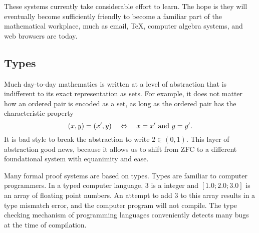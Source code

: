 \documentclass{llncs}
\begin{document}
These systems currently take considerable effort to learn.  The hope
is they will eventually become sufficiently friendly
to become a familiar part of the 
mathematical workplace, much as email, \TeX\relax, computer algebra systems, and
web browsers are today.

\subsection{Types}

Much day-to-day mathematics is written at a level of abstraction that is
indifferent to its exact representation  as sets.  For example, 
it does not matter how an ordered pair is encoded as a 
set, as long as the ordered pair has the characteristic property
 $$
 (x,y) = (x',y) \quad \Leftrightarrow\quad  x = x' \hbox{ and } y=y'.
 $$
It is bad style to break the abstraction to write $2\in(0,1)$.
This layer of abstraction good news, because it allows us to shift
from ZFC to a different foundational system with equanimity and ease.  

Many
formal proof systems  are based on
types.  Types are familiar to computer programmers.  In a typed computer language,
$3$ is a integer and $[1.0;2.0;3.0]$ is an array of floating point numbers. An attempt
to add $3$ to this array results in a type mismatch error, and the computer program
will not compile.  The type checking mechanism of programming languages
conveniently detects many bugs at the time
of compilation.  %
\end{document}
